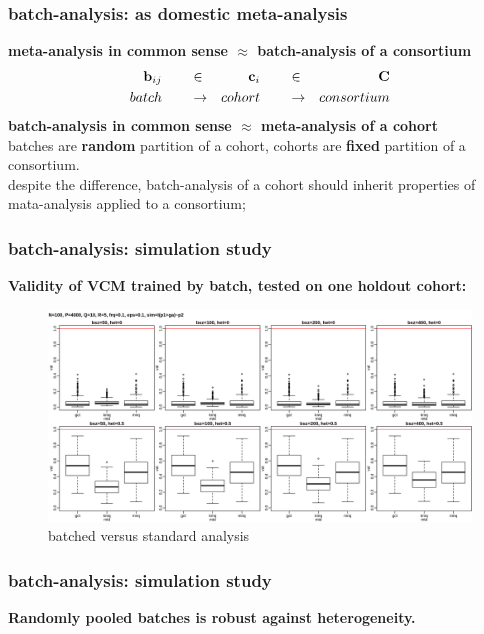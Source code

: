 \documentclass{beamer}
\begin{document}
\begin{frame}\frametitle{batch-analysis: as domestic meta-analysis}
  \textbf{meta-analysis in common sense $\approx$ batch-analysis of a
    consortium}
  \begin{align*}
    \mathbf{b}_{ij} & \qquad \in & \mathbf{c}_i  & \qquad \in & \mathbf{C} \\
    batch    & \qquad \to & cohort & \qquad \to & consortium
  \end{align*}
  \textbf{batch-analysis in common sense $\approx$ meta-analysis of a cohort} \\
  batches are {\color{red}\textbf{random}} partition of a cohort,
  cohorts are {\color{red}\textbf{fixed}} partition of a consortium. \\
  despite the difference, batch-analysis of a cohort should inherit
  properties of mata-analysis applied to a consortium;
\end{frame}
\begin{frame} \frametitle{batch-analysis: simulation study} %
  \textbf{Validity of VCM trained by batch, tested on one holdout cohort:}
  \begin{figure}[h]
    \centering
    \includegraphics[width=1.0\textwidth]{img/bat_vcm_mse}
    \caption{batched versus standard analysis}
    \label{fig:bat}
  \end{figure}
\end{frame}
\begin{frame} \frametitle{batch-analysis: simulation study}
  \textbf{Randomly pooled batches is robust against heterogeneity.}
\end{frame}
\end{document}
